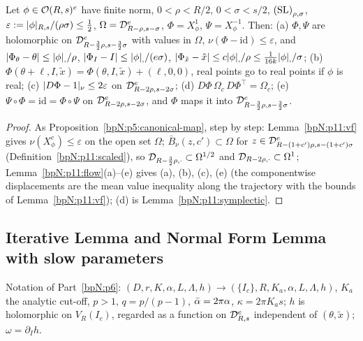 \begin{proposition}\label{bpN:p11:canonical-map}
Let $\phi\in\mathcal O(R,s)^e$ have finite norm, $0<\rho<R/2$, $0<\sigma<s/2$, $\textup{(SL)}_{\rho,\sigma}$, $\varepsilon:=\lvert \phi\rvert_{R,s}/(\rho\sigma)\le\frac12$, $\Omega=\mathcal D_{R-\rho,s-\sigma}^e$, $\Phi=X^1_\phi$, $\Psi=X^{-1}_\phi$. Then: (a) $\Phi,\Psi$ are holomorphic on $\mathcal D_{R-\frac32\rho,s-\frac32\sigma}^e$ with values in $\Omega$, $\nu(\Phi-\mathrm{id})\le\varepsilon$, and $\lvert \Phi_\theta-\theta\rvert\le\lvert \phi\rvert_{,}/\rho$, $\lvert \Phi_I-I\rvert\le\lvert \phi\rvert_{,}/(e\sigma)$, $\lvert \Phi_{\tilde x}-\tilde x\rvert\le c\lvert \phi\rvert_{,}/\rho\le\frac1{16k}\lvert \phi\rvert_{,}/\sigma$; (b) $\Phi(\theta+\ell,I,\tilde x)=\Phi(\theta,I,\tilde x)+(\ell,0,0)$, real points go to real points if $\phi$ is real; (c) $\lvert D\Phi-1\rvert_\nu\le2\varepsilon$ on $\mathcal D_{R-2\rho,s-2\sigma}^e$; (d) $D\Phi\,\Omega_c\,D\Phi^\top=\Omega_c$; (e) $\Psi\circ\Phi=\mathrm{id}=\Phi\circ\Psi$ on $\mathcal D_{R-2\rho,s-2\sigma}^e$, and $\Phi$ maps it into $\mathcal D_{R-\frac32\rho,s-\frac32\sigma}^e$.
\end{proposition}
\begin{proof}
As Proposition~\ref{bpN:p5:canonical-map}, step by step: Lemma~\ref{bpN:p11:vf} gives $\nu(X^c_\phi)\le\varepsilon$ on the open set $\Omega$; $\bar B_\nu(z,c')\subset\Omega$ for $z\in\mathcal D_{R-(1+c')\rho,s-(1+c')\sigma}^e$ (Definition~\ref{bpN:p11:scaled}), so $\mathcal D_{R-\frac32\rho,\cdot}\subset\Omega^{1/2}$ and $\mathcal D_{R-2\rho,\cdot}\subset\Omega^1$; Lemma~\ref{bpN:p11:flow}(a)--(e) gives (a), (b), (c), (e) (the componentwise displacements are the mean value inequality along the trajectory with the bounds of Lemma~\ref{bpN:p11:vf}); (d) is Lemma~\ref{bpN:p11:symplectic}.
\end{proof}

\subsection{Iterative Lemma and Normal Form Lemma with slow parameters}\label{bpN:p11:s-nf}

Notation of Part~\ref{bpN:p6}: $(D,r,K,\alpha,L,\Lambda,h)\to(\{I_c\},R,K_a,\alpha,L,\Lambda,h)$, $K_a$ the analytic cut-off, $p>1$, $q=p/(p-1)$, $\bar\alpha=2\pi\alpha$, $\kappa=2\pi K_as$; $h$ is holomorphic on $V_R(I_c)$, regarded as a function on $\mathcal D_{R,s}^e$ independent of $(\theta,\tilde x)$; $\omega=\partial_Ih$.

